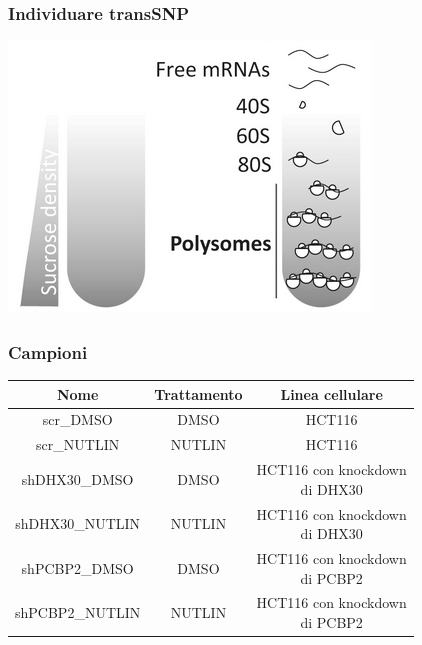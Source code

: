 \documentclass{beamer}
\begin{document}
	\begin{frame}
		\frametitle{Individuare transSNP}
		\begin{center}
			\includegraphics[height=0.8\textheight]{media/polprof.png}
		\end{center}
	\end{frame}
	\begin{frame}
		\frametitle{Campioni}
		\begin{table}
			\begin{tabular}{|c|c|c|}
				\hline
				Nome & Trattamento & Linea cellulare\\
				\hline
				scr\_DMSO & DMSO & HCT116\\
				\hline
				scr\_NUTLIN & NUTLIN & HCT116\\
				\hline
				shDHX30\_DMSO & DMSO & \makecell{HCT116 con knockdown\\di DHX30}\\
				\hline
				shDHX30\_NUTLIN & NUTLIN & \makecell{HCT116 con knockdown\\di DHX30}\\
				\hline
				shPCBP2\_DMSO & DMSO & \makecell{HCT116 con knockdown\\di PCBP2}\\
				\hline
				shPCBP2\_NUTLIN & NUTLIN & \makecell{HCT116 con knockdown\\di PCBP2}\\
				\hline
			\end{tabular}
		\end{table}
	\end{frame}
\end{document}

